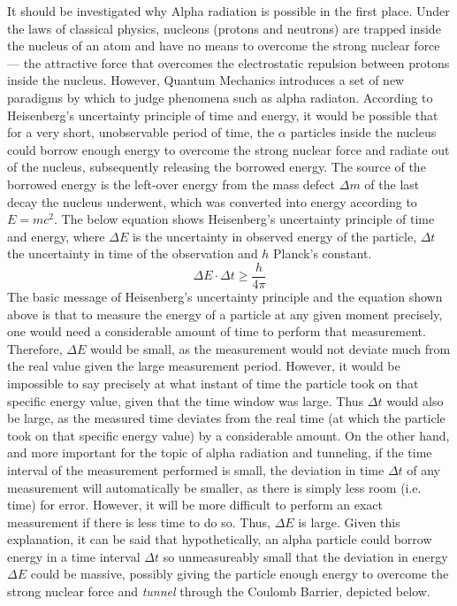 It should be investigated why Alpha radiation is possible in the first place. Under the laws of classical physics, nucleons (protons and neutrons) are trapped inside the nucleus of an atom and have no means to overcome the strong nuclear force --- the attractive force that overcomes the electrostatic repulsion between protons inside the nucleus. However, Quantum Mechanics introduces a set of new paradigms by which to judge phenomena such as alpha radiaton. According to Heisenberg's uncertainty principle of time and energy, it would be possible that for a very short, unobservable period of time, the $\alpha$ particles inside the nucleus could borrow enough energy to overcome the strong nuclear force and radiate out of the nucleus, subsequently releasing the borrowed energy. The source of the borrowed energy is the left-over energy from the mass defect $\Delta m$ of the last decay the nucleus underwent, which was converted into energy according to $E = mc^2$. The below equation shows Heisenberg's uncertainty principle of time and energy, where $\Delta E$ is the uncertainty in observed energy of the particle, $\Delta t$ the uncertainty in time of the observation and $h$ Planck's constant. $$\Delta E \cdot \Delta t \geq \frac{h}{4\pi}$$ The basic message of Heisenberg's uncertainty principle and the equation shown above is that to measure the energy of a particle at any given moment precisely, one would need a considerable amount of time to perform that measurement. Therefore, $\Delta E$ would be small, as the measurement would not deviate much from the real value given the large measurement period. However, it would be impossible to say precisely at what instant of time the particle took on that specific energy value, given that the time window was large. Thus $\Delta t$ would also be large, as the measured time deviates from the real time (at which the particle took on that specific energy value) by a considerable amount. On the other hand, and more important for the topic of alpha radiation and tunneling, if the time interval of the measurement performed is small, the deviation in time $\Delta t$ of any measurement will automatically be smaller, as there is simply less room (i.e. time) for error. However, it will be more difficult to perform an exact measurement if there is less time to do so. Thus, $\Delta E$ is large. Given this explanation, it can be said that hypothetically, an alpha particle could borrow energy in a time interval $\Delta t$ so unmeasureably small that the deviation in energy $\Delta E$ could be massive, possibly giving the particle enough energy to overcome the strong nuclear force and \emph{tunnel} through the Coulomb Barrier, depicted below.

